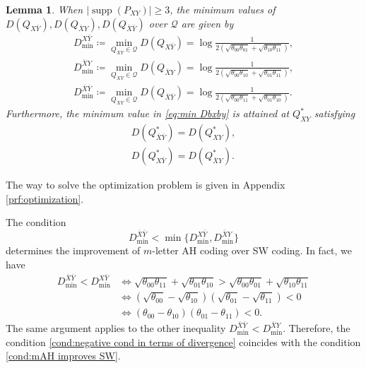 \documentclass[journal,onecolumn]{IEEEtran}
\newtheorem{lemma}[theorem]{Lemma}
\theoremstyle{definition}
\theoremstyle{remark}
\newcommand{\Dxby}{D({Q_{X\bar{Y}}})}
\newcommand{\Dbxy}{D({Q_{\bar{X}Y}})}
\newcommand{\Dbxby}{D({Q_{\bar{X}\bar{Y}}})}
\newcommand{\Qxy}{Q_{XY}}
\newcommand{\Qxby}{Q_{X\bar{Y}}}
\newcommand{\Qbxy}{Q_{\bar{X}Y}}
\newcommand{\Qbxby}{Q_{\bar{X}\bar{Y}}}
\newcommand{\Dxyas}{D(\Qxy^*)}
\newcommand{\Dxbyas}{D(\Qxby^*)}
\newcommand{\Dbxyas}{D(\Qbxy^*)}
\newcommand{\Dbxbyas}{D(\Qbxby^*)}
\newcommand{\Dxbymin}{D^{X\bar{Y}}_\mathrm{min}}
\newcommand{\Dbxymin}{D^{\bar{X}Y}_\mathrm{min}}
\newcommand{\Dbxbymin}{D^{\bar{X}\bar{Y}}_\mathrm{min}}
\begin{document}
    \begin{lemma}\label{lem:minimum divergence}
    When $|\operatorname{supp}(P_{XY})|\geq 3$, the minimum values of $\Dxby,\Dbxy,\Dbxby$ over $\mathcal{Q}$ are given by
    \begin{align}
        \Dxbymin \coloneqq \min_{\Qxy \in \mathcal{Q}} \Dxby =\log\frac{1}{2(\sqrt{\theta_{00}\theta_{01}}+\sqrt{\theta_{10}\theta_{11}})},\label{eq:min Dxby} \\ 
        \Dbxymin\coloneqq \min_{\Qxy \in \mathcal{Q}} \Dbxy=\log\frac{1}{2(\sqrt{\theta_{00}\theta_{10}}+\sqrt{\theta_{01}\theta_{11}})},\label{eq:min Dbxy} \\
        \Dbxbymin \coloneqq \min_{\Qxy \in \mathcal{Q}} \Dbxby=\log\frac{1}{2(\sqrt{\theta_{00}\theta_{11}}+\sqrt{\theta_{01}\theta_{10}})}.\label{eq:min Dbxby}
    \end{align}
    Furthermore, the minimum value in \eqref{eq:min Dbxby} is attained at $\Qxy^*$ satisfying
    \begin{align}
        \Dbxbyas = \Dxyas,\label{eq:boundary equality} \\
        \Dxbyas = \Dbxyas.\label{eq:boundary equality2}
    \end{align}
    \end{lemma}
    The way to solve the optimization problem is given in Appendix \ref{prf:optimization}.

    The condition 
    \begin{equation}\label{cond:negative cond in terms of divergence}
        \Dbxbymin < \min\{\Dxbymin, \Dbxymin\}
    \end{equation}
    determines the improvement of $m$-letter AH coding over SW coding.
    In fact, we have
    \begin{align*}
            \Dbxbymin < \Dxbymin
            &\Leftrightarrow
            \sqrt{\theta_{00}\theta_{11}} + \sqrt{\theta_{01}\theta_{10}} > \sqrt{\theta_{00}\theta_{01}} + \sqrt{\theta_{10}\theta_{11}}\\
            &\Leftrightarrow
            (\sqrt{\theta_{00}}-\sqrt{\theta_{10}})(\sqrt{\theta_{01}}-\sqrt{\theta_{11}}) < 0\\
            &\Leftrightarrow
            (\theta_{00}-\theta_{10})(\theta_{01}-\theta_{11}) < 0.
    \end{align*}
    The same argument applies to the other inequality $\Dbxbymin < \Dbxymin$.
    Therefore, the condition \eqref{cond:negative cond in terms of divergence} coincides with
    the condition \eqref{cond:mAH improves SW}.
\end{document}
